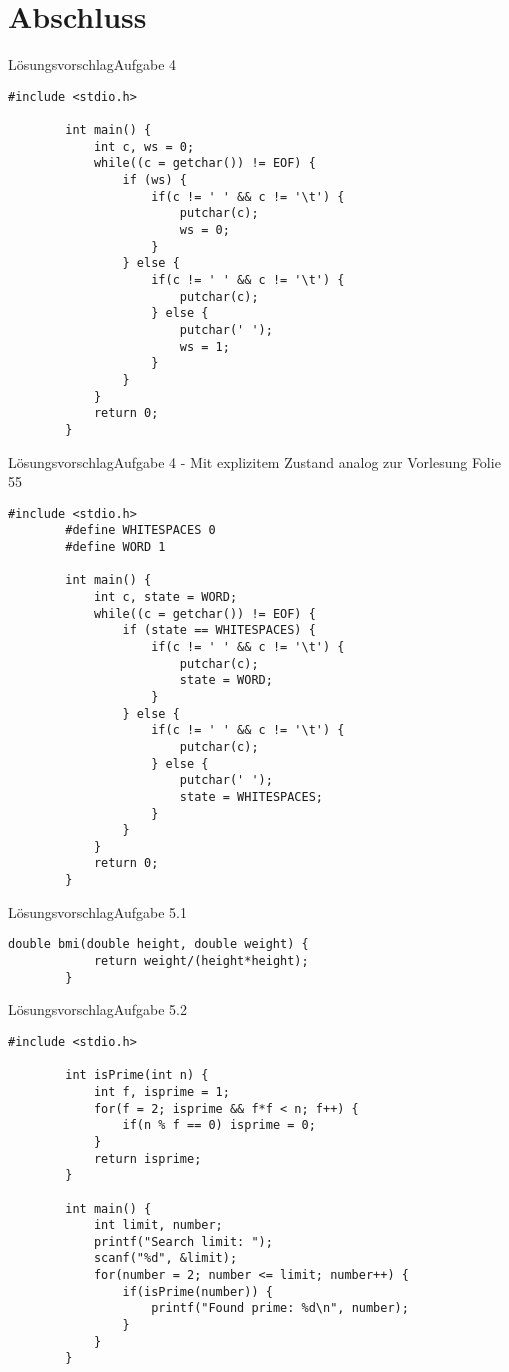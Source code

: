 \documentclass[10pt]{beamer} %
\begin{document}
\section{Abschluss}

\begin{frame}[fragile]{Lösungsvorschlag}{Aufgabe 4}

	\begin{lstlisting}[gobble=4]
		#include <stdio.h>
		
		int main() {
			int c, ws = 0;
			while((c = getchar()) != EOF) {
				if (ws) {
					if(c != ' ' && c != '\t') {
						putchar(c);
						ws = 0;
					}
				} else {
					if(c != ' ' && c != '\t') {
						putchar(c);
					} else {
						putchar(' ');
						ws = 1;
					}
				}
			}
			return 0;
		}
	\end{lstlisting}

\end{frame}

\begin{frame}[fragile]{Lösungsvorschlag}{Aufgabe 4 - Mit explizitem Zustand analog zur Vorlesung Folie 55}

	\begin{lstlisting}[basicstyle=\tiny\ttfamily,gobble=4]
		#include <stdio.h>
		#define WHITESPACES 0
		#define WORD 1
		
		int main() {
			int c, state = WORD;			
			while((c = getchar()) != EOF) {
				if (state == WHITESPACES) {
					if(c != ' ' && c != '\t') {
						putchar(c);
						state = WORD;
					}
				} else {
					if(c != ' ' && c != '\t') {
						putchar(c);
					} else {
						putchar(' ');
						state = WHITESPACES;
					}
				}
			}
			return 0;
		} 
	\end{lstlisting}

\end{frame}

\begin{frame}[fragile]{Lösungsvorschlag}{Aufgabe 5.1}

	\begin{lstlisting}[gobble=4]
		double bmi(double height, double weight) {
			return weight/(height*height);
		}
	\end{lstlisting}
	
\end{frame}


\begin{frame}[fragile]{Lösungsvorschlag}{Aufgabe 5.2}

	\begin{lstlisting}[gobble=4]
		#include <stdio.h>
		
		int isPrime(int n) {
			int f, isprime = 1;
			for(f = 2; isprime && f*f < n; f++) {
				if(n % f == 0) isprime = 0;
			}
			return isprime;
		}
			
		int main() {
			int limit, number;
			printf("Search limit: ");
			scanf("%d", &limit);
			for(number = 2; number <= limit; number++) {
				if(isPrime(number)) {
					printf("Found prime: %d\n", number);
				}
			}
		}	 
	\end{lstlisting}
	
\end{frame}
\end{document}
